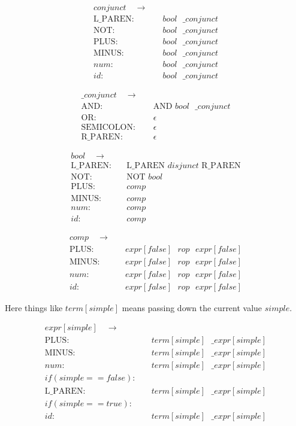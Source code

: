 \documentclass{article}
\begin{document}
\begin{align*}
conjunct \quad  \to & \quad\\
\text{L\_PAREN}: & \quad bool \text{ } \_conjunct \\
\text{NOT}: & \quad bool \text{ } \_conjunct \\
\text{PLUS}: & \quad bool \text{ } \_conjunct \\
\text{MINUS}: & \quad bool \text{ } \_conjunct \\
num: & \quad bool \text{ } \_conjunct \\
id: & \quad  bool \text{ } \_conjunct
\end{align*}

\begin{align*}
\_conjunct \quad  \to & \quad\\
\text{AND}: & \quad \text{AND } bool \text{ } \_conjunct\\
\text{OR}: & \quad \epsilon \\
\text{SEMICOLON}: & \quad \epsilon \\
\text{R\_PAREN}: & \quad \epsilon
\end{align*}

\begin{align*}
bool \quad  \to & \quad\\
\text{L\_PAREN}: & \quad \text{L\_PAREN } disjunct \text{ R\_PAREN} \\
\text{NOT}: & \quad \text{NOT } bool \\
\text{PLUS}: & \quad comp \\
\text{MINUS}: & \quad comp \\
num: & \quad comp \\
id: & \quad comp
\end{align*}

\begin{align*}
comp \quad  \to & \quad\\
\text{PLUS}: & \quad expr[false] \text{ } rop  \text{ } expr[false] \\
\text{MINUS}: & \quad expr[false] \text{ } rop  \text{ } expr[false] \\
num: & \quad expr[false] \text{ } rop  \text{ } expr[false] \\
id: & \quad expr[false] \text{ } rop  \text{ } expr[false]
\end{align*}

Here things like $term[simple]$ means passing down the current value $simple$.

\begin{align*}
expr[simple] \quad  \to & \quad\\
\text{PLUS}: & \quad term[simple] \text{ } \_expr[simple] \\
\text{MINUS}: & \quad term[simple] \text{ } \_expr[simple] \\
num: & \quad term[simple] \text{ } \_expr[simple] \\
if (simple == false): &\\
\text{L\_PAREN}: & \quad term[simple] \text{ } \_expr[simple] \\
if (simple == true): &\\
id: & \quad term[simple] \text{ } \_expr[simple] 
\end{align*}
\end{document}
